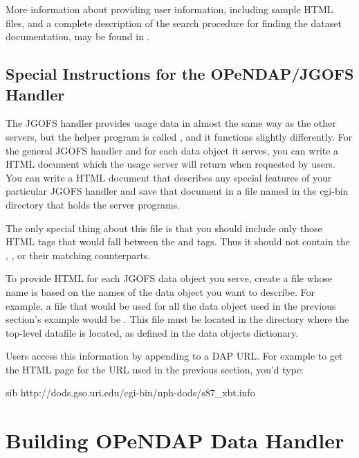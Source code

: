 \documentclass{dods-book}
\begin{document}
More information about providing user information, including sample
HTML files, and a complete description of the search procedure for
finding the dataset documentation, may be found in \DODSapi .

\section{Special Instructions for the OPeNDAP/JGOFS Handler}

The JGOFS handler provides usage data in almost the same way as the
other servers, but the  helper program is called
, and it functions slightly differently. For the general
JGOFS handler and for each data object it serves, you can write a HTML
document which the usage server will return when requested by users.
You can write a HTML document that describes any special  features of your particular JGOFS
handler and save that document in a file named  in the
cgi-bin directory that holds the server programs.


The only special thing about this file is that you should include only
those HTML tags that would fall between the  and
 tags.  Thus it should not contain the ,
,  or their matching counterparts.

To provide HTML for each JGOFS data object you serve, create a file
whose name is based on the names of the data object you want to
describe.  For example, a file that would be used for all the
 data object used in the previous section's example would
be . This file must be located in the directory
where the top-level datafile is located, as defined in the data
objects dictionary.

Users access this information by appending  to a DAP URL.
For example to get the HTML page for the URL used in the previous
section, you'd type:

\begin{vcode}{sib}
http://dods.gso.uri.edu/cgi-bin/nph-dods/s87_xbt.info  
\end{vcode}
   


\chapter{Building OPeNDAP Data Handler}
\label{dods-server,building}
\end{document}
